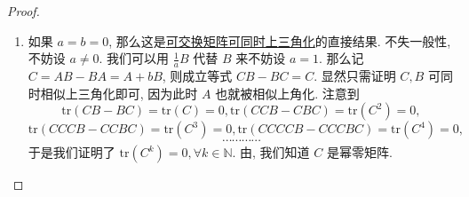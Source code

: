 \documentclass[../../main.tex]{subfiles}
\begin{document}
\begin{proof}
\begin{enumerate}
$\mathbf{Step}\,\,\mathbf{1}$ 若 \( \mathrm{Ker} A \subset \mathrm{Ker}(AB - BA) \), 则设 \( x \in \mathrm{Ker} A \), 我们有 \( ABx = BAx = 0 \), 这就证明了 \( \mathrm{Ker} A \) 是 \( B \) 不变子空间.

$\mathbf{Step}\,\,\mathbf{2}$ 若 \( \mathrm{Ker} A \not\subset \mathrm{Ker}(AB - BA) \) 不成立, 取 \( x \in \mathrm{Ker} A \) 使得 \( y = (AB - BA)x \neq 0 \). 注意到 \( \mathrm{rank}(AB - BA) = 1 \), 故 \( \mathrm{Im}(AB - BA) = \mathrm{span}\{y\} \). 但是
\[
y = (AB - BA)x = ABx - BAx = ABx \in \mathrm{Im} A,
\]
这就说明 \( \mathrm{Im}(AB - BA) \subset \mathrm{Im} A \). 于是对 \( u = Av \in \mathrm{Im} A \), 我们有
\[
Bu = BAv = ABv - (AB - BA)v \in \mathrm{Im} A,
\]
从而确实了 \( \mathrm{Im} A \) 是 \( B \) 不变子空间.

注意到 \( A, B \) 有一个公共非平凡不变子空间. 所以取这个不变子空间一组基扩充为全空间的基, 则 \( A, B \) 有表示矩阵
\[
\widetilde{A} = \begin{pmatrix} A_1 & A_3 \\ 0 & A_2 \end{pmatrix}, \widetilde{B} = \begin{pmatrix} B_1 & B_3 \\ 0 & B_2 \end{pmatrix}.
\]
注意到
\begin{align*}
r(AB - BA) &= r\begin{pmatrix} A_1B_1 - B_1A_1 & * \\ 0 & A_2B_2 - B_2A_2 \end{pmatrix}
\\
&\stackrel{\text{\hyperref[矩阵秩的基本公式3]{矩阵秩的基本公式(3)}}}{\geqslant} r\begin{pmatrix} A_1B_1 - B_1A_1 & 0 \\ 0 & A_2B_2 - B_2A_2 \end{pmatrix} 
\\
&= r(A_1B_1 - B_1A_1) + r(A_2B_2 - B_2A_2),
\end{align*}
我们有
\[
r(A_1B_1 - B_1A_1) \leqslant 1, r(A_2B_2 - B_2A_2) \leqslant 1,
\]
现在阶降下去了, 类似我们前面的归纳证明我们知道 \( A, B \) 可同时相似上三角化.

\item 如果 \( a = b = 0 \), 那么这是\hyperref[proposition:一族两两可交换的一般域上的矩阵可同时上三角化]{可交换矩阵可同时上三角化}的直接结果. 不失一般性, 不妨设 \( a \neq 0 \). 我们可以用 \( \frac{1}{a}B \) 代替 \( B \) 来不妨设 \( a = 1 \). 那么记 \( C = AB - BA = A + bB \), 则成立等式 \( CB - BC = C \). 显然只需证明 \( C, B \) 可同时相似上三角化即可, 因为此时 \( A \) 也就被相似上角化. 注意到
\[
\mathrm{tr}(CB - BC) = \mathrm{tr}(C) = 0, \mathrm{tr}(CCB - CBC) = \mathrm{tr}(C^2) = 0,
\]
\[
\mathrm{tr}(CCCB - CCBC) = \mathrm{tr}(C^3) = 0, \mathrm{tr}(CCCCB - CCCBC) = \mathrm{tr}(C^4) = 0,
\]
\[
\cdots\cdots\cdots\cdots
\]
于是我们证明了 \( \mathrm{tr}(C^k) = 0, \forall k \in \mathbb{N} \). 由, 我们知道 \( C \) 是幂零矩阵.


\end{enumerate}
\end{proof}
\end{document}
